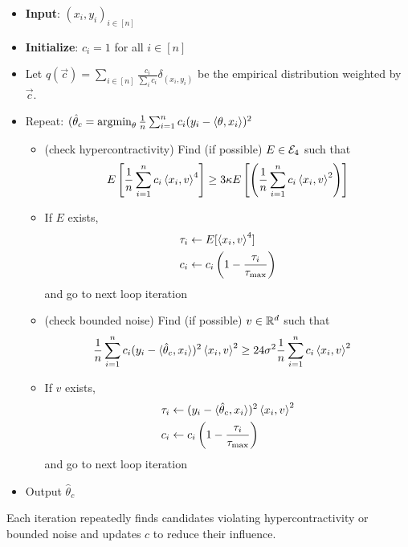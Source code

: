 \begin{itemize}
  \item \textbf{Input}: $(x_i, y_i)_{i \in [n]}$
  \item \textbf{Initialize}: $c_i = 1$ for all $i \in [n]$
  \item Let $q(\vec{c}) = \sum_{i \in [n]} \frac{c_i}{\sum_i c_i} \delta_{(x_i,
    y_i)}$ be the empirical distribution weighted by $\vec{c}$.
  \item Repeat: $(\hat\theta_c = \operatorname{argmin}_\theta \frac{1}{n}  \sum_{i=1}^n c_i (y_i - \braket{\theta, x_i})^2$
    \begin{itemize}
      \item (check hypercontractivity) Find (if possible) $E \in \mathcal{E}_{4}$ such that
	\begin{align}
	  E\left[
	    \frac{1}{n} \sum^{n}_{i=1} c_i \braket{x_i, v}^4
	  \right]
	  \geq 3 \kappa E\left[ \left( 
	      \frac{1}{n} \sum^{n}_{i=1} c_i \braket{x_i, v}^2
	  \right)\right]
	\end{align}
      \item If $E$ exists,
	\begin{align}
	  \tau_i &\leftarrow E[\braket{x_i, v}^4]\\
	  c_i &\leftarrow c_i\left(
	    1 - \frac{\tau_i}{\tau_{\max}} 
	  \right)
	\end{align}
	and go to next loop iteration
      \item (check bounded noise) Find (if possible) $v \in \mathbb{R}^d$ such that
	\begin{align}
	  \frac{1}{n} \sum_{i=1}^n c_i (y_i - \braket{\hat{\theta}_c, x_i})^2 \braket{x_i, v}^2
	  &\geq 24 \sigma^2 \frac{1}{n} \sum^{n}_{i=1} c_i \braket{x_i, v}^2
	\end{align}
      \item If $v$ exists,
	\begin{align}
	  \tau_i &\leftarrow (y_i - \braket{\hat{\theta}_c, x_i})^2 \braket{x_i, v}^2 \\
	  c_i &\leftarrow c_i\left(
	    1 - \frac{\tau_i}{\tau_{\max}} 
	  \right)
	\end{align}
	and go to next loop iteration
    \end{itemize}
  \item Output $\hat{\theta}_c$
\end{itemize}

Each iteration repeatedly finds candidates violating hypercontractivity or
bounded noise and updates $c$ to reduce their influence.

